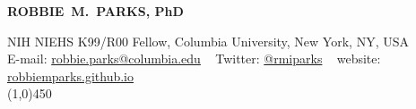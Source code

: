 \begin{center}

\textbf{{\LARGE ROBBIE~M.~PARKS, PhD}\\}

\small NIH NIEHS K99/R00 Fellow, Columbia University, New York, NY, USA\\

E-mail: \href{mailto:robbie.parks@columbia.edu}{robbie.parks@columbia.edu} ~ Twitter: \href{https://twitter.com/rmiparks}{@rmiparks} ~ website: \href{https://robbiemparks.github.io}{robbiemparks.github.io}\\

\line(1,0){450}

\end{center}